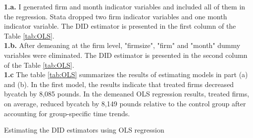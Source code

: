 \documentclass{article}
\begin{document}
\noindent \textbf{1.a.} I generated firm and month indicator variables and included all of them in the regression. Stata dropped two firm indicator variables and one month indicator variable. The DID estimator is presented in the first column of the Table \ref{tab:OLS}. \\

\noindent \textbf{1.b.} After demeaning at the firm level, "firmsize", "firm" and "month" dummy variables were eliminated. The DID estimator is presented in the second column of the Table \ref{tab:OLS}. \\

\noindent \textbf{1.c} The table \ref{tab:OLS} summarizes the results of estimating models in part (a) and (b). In the first model, the results indicate that treated firms decreased bycatch by 8,085 pounds. In the demeaned OLS regression results, treated firms, on average, reduced bycatch by 8,149 pounds relative to the control group after accounting for group-specific time trends.

\begin{table}[]
    \centering
    
    \caption{Estimating the DID estimators using OLS regression}
    \label{tab:OLS}
\end{table}
\end{document}
